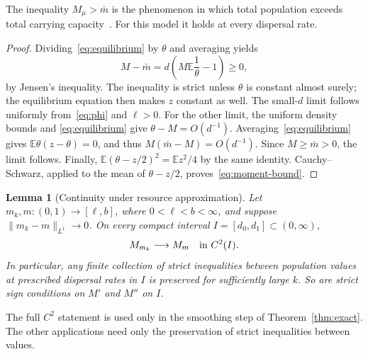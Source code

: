 \documentclass[11pt]{article}
\newtheorem{lemma}[theorem]{Lemma}
\theoremstyle{remark}
\newcommand{\E}{\mathbb E}
\begin{document}
The inequality \(M_\mu>\bar m\) is the phenomenon in which total population
exceeds total carrying capacity~\cite{Lou2006,DeAngelisNiZhang2016}.
For this model it holds at every dispersal rate.

\begin{proof}
Dividing~\eqref{eq:equilibrium} by \(\theta\) and averaging yields
\[
 M-\bar m=d\left(M\E\frac1\theta-1\right)\geq0,
\]
by Jensen's inequality. The inequality is strict unless \(\theta\) is
constant almost surely; the equilibrium equation then makes \(z\) constant
as well. The small-\(d\) limit follows uniformly from~\eqref{eq:phi} and
\(\ell>0\). For the other limit, the uniform density bounds and
\eqref{eq:equilibrium} give \(\theta-M=O(d^{-1})\).
Averaging~\eqref{eq:equilibrium} gives
\(\E\theta(z-\theta)=0\), and thus
\(M(\bar m-M)=O(d^{-1})\). Since \(M\geq\bar m>0\), the limit follows.
Finally,
\(\E(\theta-z/2)^2=\E z^2/4\) by the same identity. Cauchy--Schwarz,
applied to the mean of \(\theta-z/2\), proves~\eqref{eq:moment-bound}.
\end{proof}

\begin{lemma}[Continuity under resource approximation]\label{lem:continuity}
Let \(m_k,m:(0,1)\to[\ell,b]\), where \(0<\ell<b<\infty\), and suppose
\(\|m_k-m\|_{L^1}\to0\). On every compact interval
\(I=[d_0,d_1]\subset(0,\infty)\),
\[
 M_{m_k}\longrightarrow M_m\quad\hbox{in }C^2(I).
\]
In particular, any finite collection of strict inequalities between
population values at prescribed dispersal rates in \(I\) is preserved for
sufficiently large \(k\). So are strict sign conditions on \(M'\) and
\(M''\) on \(I\).
\end{lemma}

The full \(C^2\) statement is used only in the smoothing step of
Theorem~\ref{thm:exact}. The other applications need only the preservation
of strict inequalities between values.
\end{document}
